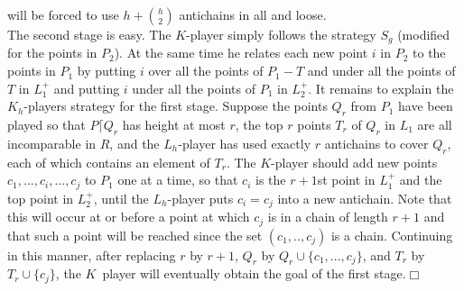 \documentclass[twoside]{article}
\begin{document}
will be forced to use   $h + \binom{h}{2}$	antichains in all and loose.\\
\indent The second stage is easy.    The   $K$-player simply follows the strategy $S_g$
(modified for the points in  $P_2$).    At the same time he relates each new point
$i$	in $P_2$ to the points in $P_1$	by putting $i$ over all the points of $P_1 - T$
and under all the points of   $T$   in   $L_1^+$   and putting   $i$   under all the points
of   $P_1$   in $L_2^+$.
It remains to explain the   $K_h$-players strategy for the first stage.
Suppose the points   $Q_r$   from   $P_1$   have been played so that   $P\lceil Q_r$   has height
at most   $r$, the top   $r$   points   $T_r$   of	$Q_r$ in $L_1$	are all incomparable in
$R$,    and the   $L_h$-player has used exactly   $r$   antichains to cover $Q_r$, each of which contains an element of   $T_r$.    The   $K$-player should add new points $c_1,..., c_i,..., c_j$    to  $P_1$   one at a time, so that   $c_i$    is the   $r + 1$st point in   $L_1^+$   and the top point in   $L_2^+$, until the   $L_h$-player puts  $c_i = c_j$    into a new antichain.    
Note that this will occur at or before a point at which $c_j$ is in a chain of length   $r + 1$   and that such a point will be reached since the set    $(c_1,.., c_j)$    is a chain.   
Continuing in this manner, after replacing $r$   by   $r+1$,   $Q_r$   by   $Q_r \cup \{c_1,..., c_j\}$, and   $T_r$   by   $T_r \cup \{c_j\}$, the $K$~player will eventually obtain the goal of the first stage.$\Box$
\end{document}
